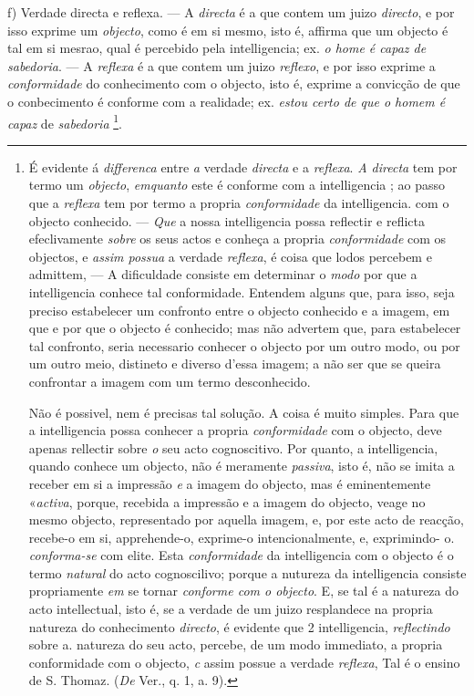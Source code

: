 f) Verdade directa e reflexa. --- A \emph{directa} é a que contem um juizo \emph{directo}, e por isso exprime um \emph{objecto}, como é em si mesmo, isto é, affirma que um objecto é tal em si mesrao, qual é percebido pela intelligencia; ex. \emph{o home é capaz de sabedoria}. --- A \emph{reflexa} é a que contem um juizo \emph{reflexo}, e por isso exprime a \emph{conformidade} do conhecimento com o objecto, isto é, exprime a convicção de que o conbecimento é conforme com a realidade; ex. \emph{estou certo de que o homem é capaz} de \emph{sabedoria} \footnote{É evidente á \emph{differenca} entre \emph{a} verdade \emph{directa} e a \emph{reflexa}. \emph{A directa} tem por termo um \emph{objecto}, \emph{emquanto} este é conforme com a intelligencia ; ao passo que a \emph{reflexa} tem por termo a propria \emph{conformidade} da intelligencia. com o objecto conhecido. --- \emph{Que} a nossa intelligencia possa reflectir e reflicta efeclivamente \emph{sobre} os seus actos e conheça a propria \emph{conformidade} com os objectos, e \emph{assim possua} a verdade \emph{reflexa}, é coisa que lodos percebem e admittem, --- A dificuldade consiste em determinar o \emph{modo} por que a intelligencia conhece tal conformidade. Entendem alguns que, para isso, seja preciso estabelecer um confronto entre o objecto conhecido e a imagem, em que e por que o objecto é conhecido; mas não advertem que, para estabelecer tal confronto, seria necessario conhecer o objecto por um outro modo, ou por um outro meio, distineto e diverso d'essa imagem; a não ser que se queira confrontar a imagem com um termo desconhecido.\par Não é possivel, nem é precisas tal solução. A coisa é muito simples. Para que a intelligencia possa conhecer a propria \emph{conformidade} com o objecto, deve apenas rellectir sobre \emph{o} seu acto cognoscitivo. Por quanto, a intelligencia, quando conhece um objecto, não é meramente \emph{passiva}, isto é, não se imita a receber em si a impressão \emph{e} a imagem do objecto, mas é eminentemente «\emph{activa}, porque, recebida a impressão e a imagem do objecto, veage no mesmo objecto, representado por aquella imagem, e, por este acto de reacção, recebe-o em si, apprehende-o, exprime-o intencionalmente, e, exprimindo- o. \emph{conforma-se} com elite. Esta \emph{conformidade} da intelligencia com o objecto é o termo \emph{natural} do acto cognoscilivo; porque a nutureza da intelligencia consiste propriamente \emph{em} se tornar \emph{conforme com o objecto}. E, se tal é a natureza do acto intellectual, isto é, se a verdade de um juizo resplandece na propria natureza do conhecimento \emph{directo}, é evidente que 2 intelligencia, \emph{reflectindo} sobre a. natureza do seu acto, percebe, de um modo immediato, a propria conformidade com o objecto, \emph{c} assim possue a verdade \emph{reflexa}, Tal é o ensino de S. Thomaz. (\emph{De} Ver., q. 1, a. 9).}.

